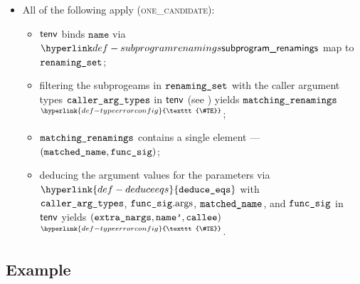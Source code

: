 \documentclass{book}
\newcommand\TypeErrorConfig[0]{\hyperlink{def-typeerrorconfig}{\texttt{\#TE}}}
\newcommand\ProseOrTypeError[0]{\hyperlink{def-proseortypeerror}{$^{\TypeErrorConfig}$}}
\newcommand\deduceeqs[0]{\hyperlink{def-deduceeqs}{\texttt{deduce\_eqs}}}
\newcommand\name[0]{\texttt{name}}
\begin{document}
\begin{itemize}
  \item All of the following apply (\textsc{one\_candidate}):
  \begin{itemize}
    \item $\textsf{tenv}$ binds $\name$ via $\subprogramrenamings$ map to $\texttt{renaming\_set}$;
    \item filtering the subprogeams in $\texttt{renaming\_set}$ with the caller argument types $\texttt{caller\_arg\_types}$
          in $\textsf{tenv}$ (see ) yields $\texttt{matching\_renamings}$ \ProseOrTypeError;
    \item $\texttt{matching\_renamings}$ contains a single element --- $(\texttt{matched\_name}, \texttt{func\_sig})$;
    \item deducing the argument values for the parameters via $\deduceeqs$ with \\
          $\texttt{caller\_arg\_types}$, $\texttt{func\_sig}.\text{args}$, $\texttt{matched\_name}$, and $\texttt{func\_sig}$ in $\textsf{tenv}$ yields
          $(\texttt{extra\_nargs}, \texttt{name'}, \texttt{callee})$ \ProseOrTypeError.
  \end{itemize}
\end{itemize}

\subsection{Example}

\end{document}
